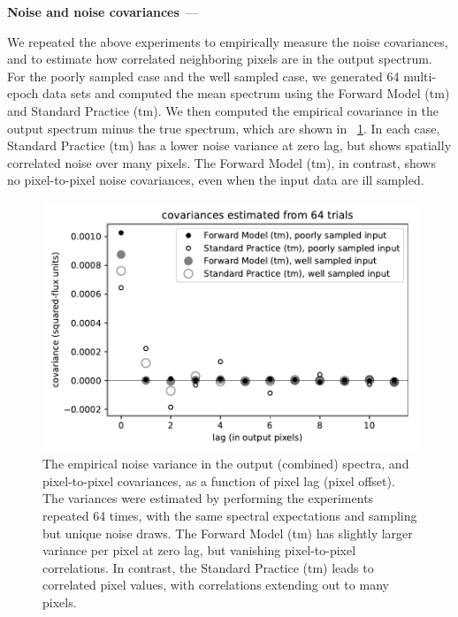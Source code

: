 \documentclass[modern]{aastex631}
\renewcommand{\paragraph}[1]{\medskip\par\noindent\textbf{#1}~---}
\newlength{\figurewidth}
\begin{document}
\paragraph{Noise and noise covariances}

We repeated the above experiments to empirically measure the noise covariances, and to estimate how correlated neighboring pixels are in the output spectrum. For the poorly sampled case and the well sampled case, we generated 64 multi-epoch data sets and computed the mean spectrum using the Forward Model (tm) and Standard Practice (tm). We then computed the empirical covariance in the output spectrum minus the true spectrum, which are shown in \figurename~\ref{fig:noise}.
In each case, Standard Practice (tm) has a lower noise variance at zero lag, but shows spatially correlated noise over many pixels.
The Forward Model (tm), in contrast, shows no pixel-to-pixel noise covariances, even when the input data are ill sampled.
\begin{figure}[t!]
    \begin{mdframed}\begin{center}
    \includegraphics[width=\figurewidth]{notebooks/noise.pdf}
    \end{center}
    \caption{The empirical noise variance in the output (combined) spectra, and pixel-to-pixel covariances, as a function of pixel lag (pixel offset). The variances were estimated by performing the experiments repeated 64 times, with the same spectral expectations and sampling but unique noise draws. The Forward Model (tm) has slightly larger variance per pixel at zero lag, but vanishing pixel-to-pixel correlations. In contrast, the Standard Practice (tm) leads to correlated pixel values, with correlations extending out to many pixels.\label{fig:noise}}
    \end{mdframed}
\end{figure}
\end{document}
